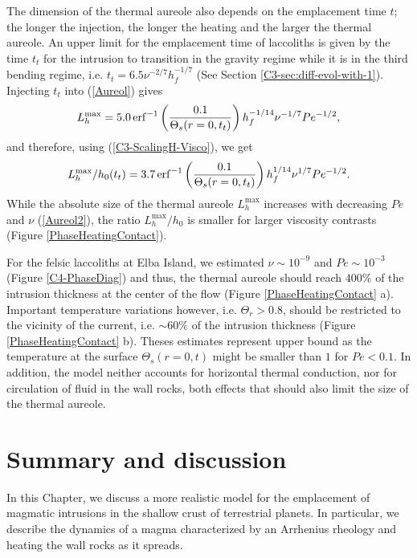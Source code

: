 The dimension of  the thermal aureole also depends  on the emplacement
time $t$;  the longer the  injection, the  longer the heating  and the
larger the thermal aureole. An upper limit for the emplacement time of
laccoliths is given by the time  $t_t$ for the intrusion to transition
in the  gravity regime while it  is in the third  bending regime, i.e.
$t_t=6.5\nu^{-2/7}h_f^{-1/7}$               (See               Section
\ref{C3-sec:diff-evol-with-1}).   Injecting $t_t$  into (\ref{Aureol})
gives
\begin{equation}
  L_h^{\text{max}}                                                           =5.0  \operatorname{erf}^{-1}\left(\frac{0.1}{\Theta_s(r=0,t_{t})}\right)h_f^{-1/14}\nu^{-1/7}Pe^{-1/2},
  \label{Aureol2}
\end{equation}
and therefore, using (\ref{C3-ScalingH-Visco}), we get
\begin{equation}
  L_h^{\text{max}}/h_0(t_t)                                                           =3.7
  \operatorname{erf}^{-1}\left(\frac{0.1}{\Theta_s(r=0,t_{t})}\right)h_f^{1/14}\nu^{1/7}Pe^{-1/2}.
  \label{Aureol3}
\end{equation}
While  the absolute  size  of the  thermal aureole  $L^{\text{max}}_h$
increases with  decreasing $Pe$  and $\nu$ (\ref{Aureol2}),  the ratio
$L_h^{\text{max}}/h_0$  is  smaller  for  larger  viscosity  contrasts
(Figure \ref{PhaseHeatingContact}).

For   the   felsic   laccoliths   at   Elba   Island,   we   estimated
$\nu \sim  10^{-9}$ and  $Pe\sim 10^{-3}$  (Figure \ref{C4-PhaseDiag})
and thus,  the thermal aureole  should reach $400\%$ of  the intrusion
thickness at the center  of the flow (Figure \ref{PhaseHeatingContact}
a).  Important temperature  variations  however, i.e.  $\Theta_r>0.8$,
should be restricted to the vicinity of the current, i.e.  $\sim 60\%$
of  the  intrusion  thickness  (Figure  \ref{PhaseHeatingContact}  b).
Theses  estimates represent  upper  bound as  the  temperature at  the
surface $\Theta_s(r=0,t)$ might be smaller  than $1$ for $Pe<0.1$.  In
addition,   the  model   neither  accounts   for  horizontal   thermal
conduction,  nor for  circulation of  fluid  in the  wall rocks,  both
effects that should also limit the size of the thermal aureole.


\section{Summary and discussion}
\label{C4-sec:discussion}

In this Chapter, we discuss a more realistic model for the emplacement
of magmatic intrusions in the shallow crust of terrestrial planets. In
particular, we  describe the dynamics  of a magma characterized  by an
Arrhenius rheology and heating the wall rocks as it spreads.

